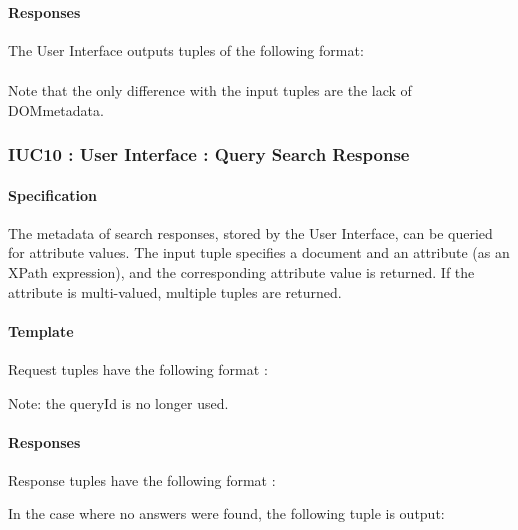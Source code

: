 \documentclass[titlepage]{article}%
\begin{document}
\paragraph{Responses}
The User Interface outputs tuples of the following format:
\begin{eqnarray*}
[\text{``SearchXpathAnswer"}; communityId; documentId; title; \\ filename; location; queryId]
\end{eqnarray*}

Note that the only difference with the input tuples are the lack of DOMmetadata. 

\subsubsection{IUC10 : User Interface : Query Search Response}
\label{iuc10}
\paragraph{Specification}
The metadata of search responses, stored by the User Interface, can be queried for attribute values.
The input tuple specifies a document and an attribute (as an XPath expression), and the corresponding attribute value is returned. If the attribute is multi-valued, multiple tuples are returned.  

\paragraph{Template}
Request tuples have the following format :
\begin{equation*}
[\text{``LookupSearchResponse"}; documentId; communityId; xpath, queryId]
\end{equation*}

Note: the queryId is no longer used.

\paragraph{Responses}

Response tuples have the following format :
\begin{equation*}
[\text{``LookupSearchResponseAnswer"}; documentId; communityId; xpath, answer, queryId]
\end{equation*}

In the case where no answers were found, the following tuple is output:
\begin{equation*}
[\text{``LookupSearchResponseAnswer"}; \text{``"}]
\end{equation*}
\end{document}
